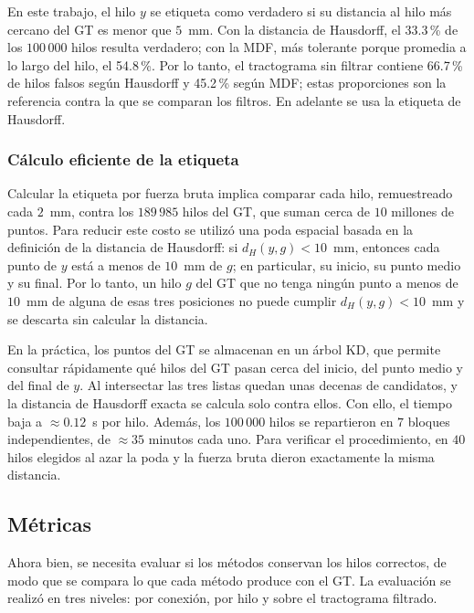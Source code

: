 \documentclass[11pt,a4paper]{article}
\begin{document}
En este trabajo, el hilo $y$ se etiqueta como verdadero si su distancia al hilo más cercano del GT es menor que $5$~mm. Con la distancia de Hausdorff, el 33.3\,\% de los $100\,000$ hilos resulta verdadero; con la MDF, más tolerante porque promedia a lo largo del hilo, el 54.8\,\%. Por lo tanto, el tractograma sin filtrar contiene 66.7\,\% de hilos falsos según Hausdorff y 45.2\,\% según MDF; estas proporciones son la referencia contra la que se comparan los filtros. En adelante se usa la etiqueta de Hausdorff.

\subsubsection{Cálculo eficiente de la etiqueta}

Calcular la etiqueta por fuerza bruta implica comparar cada hilo, remuestreado cada $2$~mm, contra los $189\,985$ hilos del GT, que suman cerca de $10$ millones de puntos. Para reducir este costo se utilizó una poda espacial basada en la definición de la distancia de Hausdorff: si $d_H(y,g)<10$~mm, entonces cada punto de $y$ está a menos de $10$~mm de $g$; en particular, su inicio, su punto medio y su final. Por lo tanto, un hilo $g$ del GT que no tenga ningún punto a menos de $10$~mm de alguna de esas tres posiciones no puede cumplir $d_H(y,g)<10$~mm y se descarta sin calcular la distancia.

En la práctica, los puntos del GT se almacenan en un árbol KD, que permite consultar rápidamente qué hilos del GT pasan cerca del inicio, del punto medio y del final de $y$. Al intersectar las tres listas quedan unas decenas de candidatos, y la distancia de Hausdorff exacta se calcula solo contra ellos. Con ello, el tiempo baja a $\approx 0.12$~s por hilo. Además, los $100\,000$ hilos se repartieron en $7$ bloques independientes, de $\approx 35$ minutos cada uno. Para verificar el procedimiento, en $40$ hilos elegidos al azar la poda y la fuerza bruta dieron exactamente la misma distancia.

\subsection{Métricas}

Ahora bien, se necesita evaluar si los métodos conservan los hilos correctos, de modo que se compara lo que cada método produce con el GT. La evaluación se realizó en tres niveles: por conexión, por hilo y sobre el tractograma filtrado.

\end{document}
